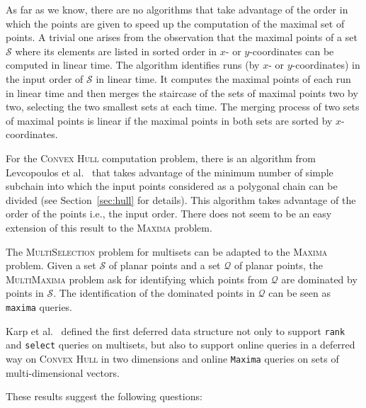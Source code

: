 
As far as we know, there are no algorithms that take advantage of the
order in which the points are given to speed up the computation of the
maximal set of points. A trivial one arises from the observation that
the maximal points of a set $\mathcal{S}$ where its elements are
listed in sorted order in $x$- or $y$-coordinates can be computed in
linear time. The algorithm identifies runs (by $x$- or
$y$-coordinates) in the input order of $\mathcal{S}$ in linear
time. It computes the maximal points of each run in linear time and
then merges the staircase of the sets of maximal points two by two,
selecting the two smallest sets at each time. The merging
process of two sets of maximal points is linear if the maximal points
in both sets are sorted by $x$-coordinates. 


For the \textsc{Convex Hull} computation problem, there is an
algorithm from Levcopoulos et
al.~\cite{2002-SWAT-AdaptiveAlgorithmsForConstructingConvexHullsAndTriangulationsOfPolygonalChains-LevcopoulosLingasMitchell}
that takes advantage of the minimum number of simple subchain into
which the input points considered as a polygonal chain can be divided
(see Section~\ref{sec:hull} for details). This algorithm takes
advantage of the order of the points i.e., the input order. There does
not seem to be an easy extension of this result to the \textsc{Maxima}
problem.

The \textsc{MultiSelection} problem for multisets can be adapted to
the \textsc{Maxima} problem. Given a set $\mathcal{S}$ of planar
points and a set $\mathcal{Q}$ of planar points, the
\textsc{MultiMaxima} problem ask for identifying which points from
$\mathcal{Q}$ are dominated by points in $\mathcal{S}$. The
identification of the dominated points in $\mathcal{Q}$ can be seen as
\texttt{maxima} queries.

Karp et al.~\cite{1988-SIAM-DeferredDataStructuring-KarpMotwaniRaghavan}
defined the first deferred data structure not only to support
\texttt{rank} and \texttt{select} queries on multisets, but also to
support online queries in a deferred way on \textsc{Convex Hull} in
two dimensions and online \texttt{Maxima} queries on sets of
multi-dimensional vectors.


These results suggest the following questions:

